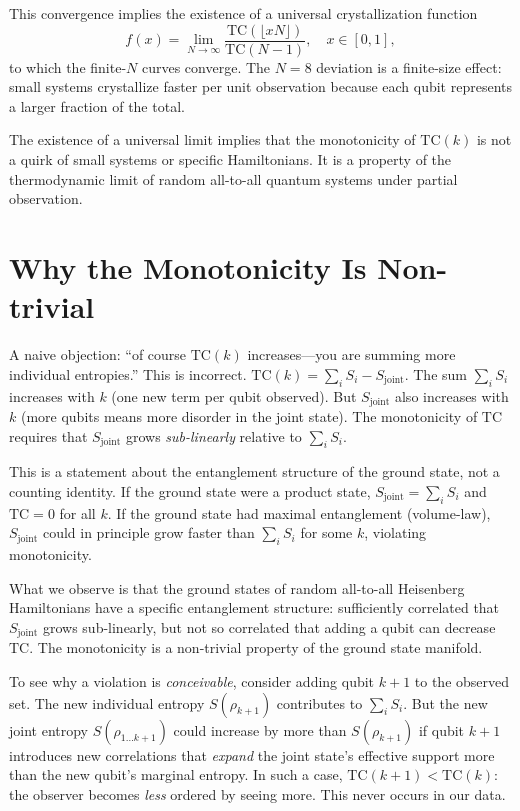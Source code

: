 \documentclass[aps,pra,twocolumn,superscriptaddress,floatfix]{revtex4-2}
\begin{document}
This convergence implies the existence of a universal crystallization function
\begin{equation}
f(x) = \lim_{N \to \infty} \frac{\mathrm{TC}(\lfloor xN \rfloor)}{\mathrm{TC}(N-1)}, \quad x \in [0, 1],
\end{equation}
to which the finite-$N$ curves converge.
The $N = 8$ deviation is a finite-size effect: small systems crystallize faster per unit observation because each qubit represents a larger fraction of the total.

The existence of a universal limit implies that the monotonicity of $\mathrm{TC}(k)$ is not a quirk of small systems or specific Hamiltonians.
It is a property of the thermodynamic limit of random all-to-all quantum systems under partial observation.


\section{Why the Monotonicity Is Non-trivial}
\label{sec:nontrivial}

A naive objection: ``of course $\mathrm{TC}(k)$ increases---you are summing more individual entropies.''
This is incorrect.
$\mathrm{TC}(k) = \sum_i S_i - S_{\mathrm{joint}}$.
The sum $\sum_i S_i$ increases with $k$ (one new term per qubit observed).
But $S_{\mathrm{joint}}$ also increases with $k$ (more qubits means more disorder in the joint state).
The monotonicity of $\mathrm{TC}$ requires that $S_{\mathrm{joint}}$ grows \emph{sub-linearly} relative to $\sum_i S_i$.

This is a statement about the entanglement structure of the ground state, not a counting identity.
If the ground state were a product state, $S_{\mathrm{joint}} = \sum_i S_i$ and $\mathrm{TC} = 0$ for all $k$.
If the ground state had maximal entanglement (volume-law), $S_{\mathrm{joint}}$ could in principle grow faster than $\sum_i S_i$ for some $k$, violating monotonicity.

What we observe is that the ground states of random all-to-all Heisenberg Hamiltonians have a specific entanglement structure: sufficiently correlated that $S_{\mathrm{joint}}$ grows sub-linearly, but not so correlated that adding a qubit can decrease $\mathrm{TC}$.
The monotonicity is a non-trivial property of the ground state manifold.

To see why a violation is \emph{conceivable}, consider adding qubit $k+1$ to the observed set.
The new individual entropy $S(\rho_{k+1})$ contributes to $\sum_i S_i$.
But the new joint entropy $S(\rho_{1\ldots k+1})$ could increase by more than $S(\rho_{k+1})$ if qubit $k+1$ introduces new correlations that \emph{expand} the joint state's effective support more than the new qubit's marginal entropy.
In such a case, $\mathrm{TC}(k+1) < \mathrm{TC}(k)$: the observer becomes \emph{less} ordered by seeing more.
This never occurs in our data.
\end{document}

